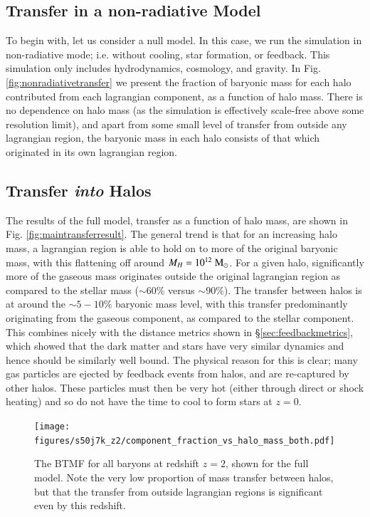 \subsection{Transfer in a non-radiative Model}

To begin with, let us consider a null model. In this case, we run the simulation
in non-radiative mode; i.e. without cooling, star formation, or feedback. This
simulation only includes hydrodynamics, cosmology, and gravity. In Fig.
\ref{fig:nonradiativetransfer} we present the fraction of baryonic mass for
each halo contributed from each lagrangian component, as a function of halo
mass. There is no dependence on halo mass (as the simulation is effectively
scale-free above some resolution limit), and apart from some small level of 
transfer from outside any lagrangian region, the baryonic mass in each halo
consists of that which originated in its own lagrangian region.

\subsection{Transfer \emph{into} Halos}

The results of the full model, transfer as a function of halo mass, are shown in Fig.
\ref{fig:maintransferresult}. The general trend is that for an increasing halo mass,
a lagrangian region is able to hold on to more of the original baryonic mass, with
this flattening off around $M_H = 10^{12} \;{\rm M}_{\odot}$. For a given halo, significantly
more of the gaseous mass originates outside the original lagrangian region as compared
to the stellar mass ($\sim 60 \%$ versus $\sim 90 \%$). The transfer between halos is
at around the $\sim 5-10\%$ baryonic mass level, with this transfer predominantly
originating from the gaseous component, as compared to the stellar component. This combines
nicely with the distance metrics shown in \S \ref{sec:feedbackmetrics}, which
showed that the dark matter and stars have very similar dynamics and hence should be
similarly well bound. The physical reason for this is clear; many gas particles are ejected
by feedback events from halos, and are re-captured by other halos. These particles must then
be very hot (either through direct or shock heating) and so do not have the time to cool to
form stars at $z=0$.

\begin{figure}
	\centering
	\texttt{[image: figures/s50j7k\_z2/component\_fraction\_vs\_halo\_mass\_both.pdf]}
	\vspace{-0.7cm}
	\caption{The BTMF for all baryons at redshift $z=2$, shown for
	the full \simba{} model. Note the very low proportion of mass transfer
	between halos, but that the transfer from outside lagrangian regions
	is significant even by this redshift.}
	\label{fig:z2resultlt}
\end{figure}


